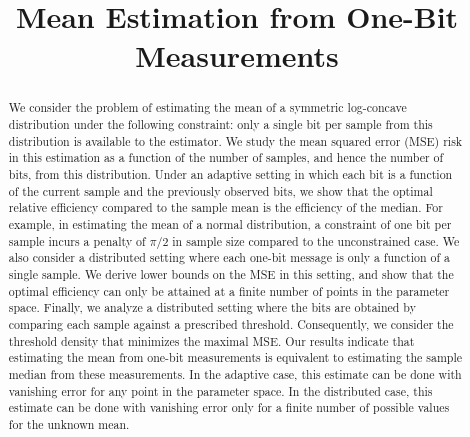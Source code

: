 \documentclass[letterpaper, 11pt]{IEEEtran}      %
\author{
    \IEEEauthorblockN{John C. Duchi\IEEEauthorrefmark{1}\IEEEauthorrefmark{2} and
Alon Kipnis\IEEEauthorrefmark{1} \\}
    \IEEEauthorblockA{\IEEEauthorrefmark{1}Stanford University, Department of Statistics \\}
    \IEEEauthorblockA{\IEEEauthorrefmark{2}Stanford University, Department of Electrical Engineering. }
}
\title{\LARGE \bf Mean Estimation from One-Bit Measurements}
\begin{document}
\graphicspath{{../Figs/}}
\maketitle
\thispagestyle{empty}
\pagestyle{empty}


\begin{abstract}
We consider the problem of estimating the mean of a symmetric log-concave distribution under the following constraint: only a single bit per sample from this distribution is available to the estimator. We study the mean squared error (MSE) risk in this estimation as a function of the number of samples, and hence the number of bits, from this distribution. Under an adaptive setting in which each bit is a function of the current sample and the previously observed bits, we show that the optimal relative efficiency compared to the sample mean is the efficiency of the median. For example, in estimating the mean of a normal distribution, a constraint of one bit per sample incurs a penalty of $\pi/2$ in sample size compared to the unconstrained case. 
%
We also consider a distributed setting where each one-bit message is only a function of a single sample. We derive lower bounds on the MSE in this setting, and show that the optimal efficiency can only be attained at a finite number of points in the parameter space. 
%
Finally, we analyze a distributed setting where the bits are obtained by comparing each sample against a prescribed threshold. Consequently, we consider the threshold density that minimizes the maximal MSE. 
%
Our results indicate that estimating the mean from one-bit measurements is equivalent to estimating the sample median from these measurements. In the adaptive case, this estimate can be done with vanishing error for any point in the parameter space. In the distributed case, this estimate can be done with vanishing error only for a finite number of possible values for the unknown mean. 
%
\end{abstract}



\end{document}
